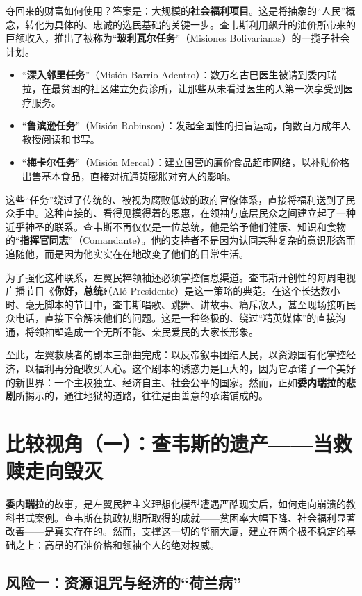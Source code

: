 夺回来的财富如何使用？答案是：大规模的\textbf{社会福利项目}。这是将抽象的“人民”概念，转化为具体的、忠诚的选民基础的关键一步。查韦斯利用飙升的油价所带来的巨额收入，推出了被称为“\textbf{玻利瓦尔任务}”（Misiones Bolivarianas）的一揽子社会计划。

\begin{itemize}
    \item “\textbf{深入邻里任务}”（Misión Barrio Adentro）：数万名古巴医生被请到委内瑞拉，在最贫困的社区建立免费诊所，让那些从未看过医生的人第一次享受到医疗服务。
    \item “\textbf{鲁滨逊任务}”（Misión Robinson）：发起全国性的扫盲运动，向数百万成年人教授阅读和书写。
    \item “\textbf{梅卡尔任务}”（Misión Mercal）：建立国营的廉价食品超市网络，以补贴价格出售基本食品，直接对抗通货膨胀对穷人的影响。
\end{itemize}
这些“任务”绕过了传统的、被视为腐败低效的政府官僚体系，直接将福利送到了民众手中。这种直接的、看得见摸得着的恩惠，在领袖与底层民众之间建立起了一种近乎神圣的联系。查韦斯不再仅仅是一位总统，他是给予他们健康、知识和食物的“\textbf{指挥官同志}”（Comandante）。他的支持者不是因为认同某种复杂的意识形态而追随他，而是因为他实实在在地改变了他们的日常生活。

为了强化这种联系，左翼民粹领袖还必须掌控信息渠道。查韦斯开创性的每周电视广播节目《\textbf{你好，总统}》（Aló Presidente）是这一策略的典范。在这个长达数小时、毫无脚本的节目中，查韦斯唱歌、跳舞、讲故事、痛斥敌人，甚至现场接听民众电话，直接下令解决他们的问题。这是一种终极的、绕过“精英媒体”的直接沟通，将领袖塑造成一个无所不能、亲民爱民的大家长形象。

至此，左翼救赎者的剧本三部曲完成：以反帝叙事团结人民，以资源国有化掌控经济，以福利再分配收买人心。这个剧本的诱惑力是巨大的，因为它承诺了一个美好的新世界：一个主权独立、经济自主、社会公平的国家。然而，正如\textbf{委内瑞拉的悲剧}所揭示的，通往地狱的道路，往往是由善意的承诺铺成的。

\section{比较视角（一）：查韦斯的遗产——当救赎走向毁灭}
\textbf{委内瑞拉}的故事，是左翼民粹主义理想化模型遭遇严酷现实后，如何走向崩溃的教科书式案例。查韦斯在执政初期所取得的成就——贫困率大幅下降、社会福利显著改善——是真实存在的。然而，支撑这一切的华丽大厦，建立在两个极不稳定的基础之上：高昂的石油价格和领袖个人的绝对权威。

\subsection{风险一：资源诅咒与经济的“荷兰病”}

